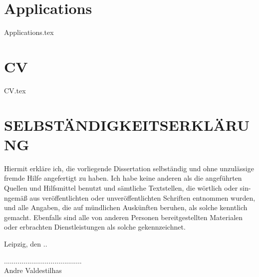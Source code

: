 \documentclass[ oneside,openright,titlepage,numbers=noenddot,headinclude,%
                footinclude=true,cleardoublepage=empty,abstractoff, %
                BCOR=5mm,paper=a4,fontsize=11pt,%
                 ngerman,american,%
                ]{scrreprt}
\begin{document}
\newpage
\chapter{Applications} \label{ap:cedalescola}
{Applications.tex}



\newpage
\chapter{CV} \label{ch:cv}
{CV.tex}

\newpage



\clearpage{}\chapter*{SELBSTÄNDIGKEITSERKLÄRUNG}

Hiermit erkläre ich, die vorliegende Dissertation selbständig und ohne unzulässige fremde Hilfe angefertigt zu haben. Ich habe keine anderen als die angeführten Quellen und Hilfsmittel benutzt und sämtliche Textstellen, die wörtlich oder sin- ngemäß aus veröffentlichten oder unveröffentlichten Schriften entnommen wurden, und alle Angaben, die auf mündlichen Auskünften beruhen, als solche kenntlich gemacht. Ebenfalls sind alle von anderen Personen bereitgestellten Materialen oder erbrachten Dienstleistungen als solche gekennzeichnet.

\vspace{20pt}\noindent
Leipzig, den \the\day.\the\month.\the\year

\vspace{80pt}\noindent
........................................\\
Andre Valdestilhas
\end{document}
